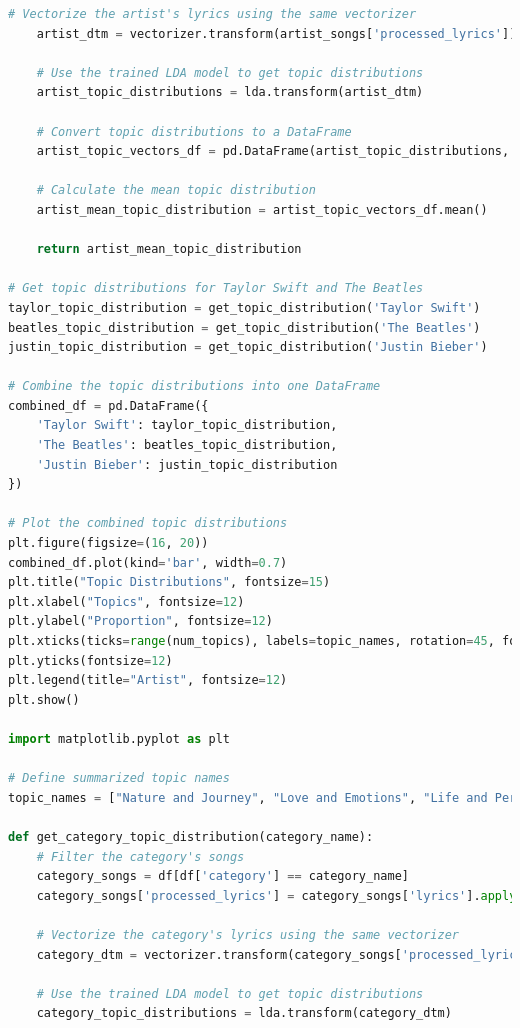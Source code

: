 \documentclass{article}
\begin{document}
\begin{lstlisting}[language=Python]
    # Vectorize the artist's lyrics using the same vectorizer
    artist_dtm = vectorizer.transform(artist_songs['processed_lyrics'])
    
    # Use the trained LDA model to get topic distributions
    artist_topic_distributions = lda.transform(artist_dtm)
    
    # Convert topic distributions to a DataFrame
    artist_topic_vectors_df = pd.DataFrame(artist_topic_distributions, columns=[f"Topic {i}" for i in range(num_topics)])
    
    # Calculate the mean topic distribution
    artist_mean_topic_distribution = artist_topic_vectors_df.mean()
    
    return artist_mean_topic_distribution

# Get topic distributions for Taylor Swift and The Beatles
taylor_topic_distribution = get_topic_distribution('Taylor Swift')
beatles_topic_distribution = get_topic_distribution('The Beatles')
justin_topic_distribution = get_topic_distribution('Justin Bieber')

# Combine the topic distributions into one DataFrame
combined_df = pd.DataFrame({
    'Taylor Swift': taylor_topic_distribution,
    'The Beatles': beatles_topic_distribution,
    'Justin Bieber': justin_topic_distribution
})

# Plot the combined topic distributions
plt.figure(figsize=(16, 20))
combined_df.plot(kind='bar', width=0.7)
plt.title("Topic Distributions", fontsize=15)
plt.xlabel("Topics", fontsize=12)
plt.ylabel("Proportion", fontsize=12)
plt.xticks(ticks=range(num_topics), labels=topic_names, rotation=45, fontsize=12)
plt.yticks(fontsize=12)
plt.legend(title="Artist", fontsize=12)
plt.show()

import matplotlib.pyplot as plt

# Define summarized topic names
topic_names = ["Nature and Journey", "Love and Emotions", "Life and Perceptions", "Youth and Adolescence", "World and Ambition"]

def get_category_topic_distribution(category_name):
    # Filter the category's songs
    category_songs = df[df['category'] == category_name]
    category_songs['processed_lyrics'] = category_songs['lyrics'].apply(preprocess_lyrics)
    
    # Vectorize the category's lyrics using the same vectorizer
    category_dtm = vectorizer.transform(category_songs['processed_lyrics'])
    
    # Use the trained LDA model to get topic distributions
    category_topic_distributions = lda.transform(category_dtm)
    

\end{lstlisting}
\end{document}

